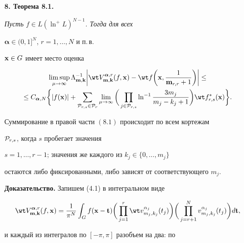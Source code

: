 {\bf 8. Теорема 8.1.} {\it Пусть $f\in L(\ln^+L)^{N-1}$. Тогда для всех


${\boldsymbol {\alpha}}\in (0,1]^N$, $r=1,\dotsc,N$ и п.\,в.


${\bold x}\in G$ имеет место оценка


\begin{multline}


\limsup_{\mu \to\infty}


\Lambda_{{\bold m},{\bold k}}^{-1}


\bigg|\wt V^{{\boldsymbol {\alpha}},r}_{{\bold m},{\bold k}}(f,{\bold x})


-\wt f\bigg({\bold x},\frac{1}{{\bold m}_{r,r}+1}\bigg)\bigg|\le \\


%


\le C_{{\boldsymbol {\alpha}},N}\bigg\{|f({\bold x})|+


\sum_{{\cal P}_{r,s}\in {\cal P}_{r}}


\lim_{\mu \to \infty}\bigg(\prod_{j\in {\cal P}_{r,s} }


\ln^{-1}\frac{3 m_j}{m_j-k_j+1}\bigg) \wt f^*_{r,s}({\bold x})\bigg\}.


\end{multline}


Суммирование в правой части $(8.1)$ происходит по всем кортежам


${\cal P}_{r,s}$, когда $s$ пробегает значения


$s=1,\dotsc,r-1$; значения же каждого из $k_j\in \{0,\dotsc,m_j\}$


остаются либо фиксированными, либо зависят от соответствующего $m_j$.}


\medskip








{\bf Доказательство.} Запишем (4.1) в интегральном виде


$$


\wt V^{{\boldsymbol {\alpha}},r}_{{\bold m},{\bold k}}(f,{\bold x})


=\frac{1}{\pi^N}


\int_G f({\bold x}-{\bold t})\bigg(\prod_{j=1}^r


\wt v_{m_j,k_j}^{\alpha_j}(t_j)\bigg)


\bigg(\prod_{j=r+1}^N v_{m_j,k_j}^{\alpha_j}(t_j)\bigg)d{\bold t},


$$


и каждый из интегралов по $[-\pi,\pi]$ разобъем на два: по


